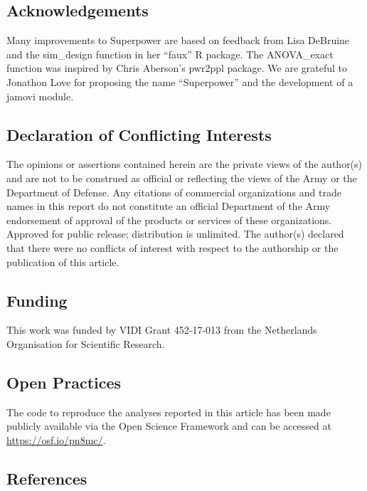 \documentclass[
  ,jou,floatsintext]{apa6}
\begin{document}
\hypertarget{acknowledgements}{%
\subsection{Acknowledgements}\label{acknowledgements}}

Many improvements to Superpower are based on feedback from Lisa DeBruine and the sim\_design function in her \enquote{faux} R package. The ANOVA\_exact function was inspired by Chris Aberson's pwr2ppl package. We are grateful to Jonathon Love for proposing the name \enquote{Superpower} and the development of a jamovi module.

\hypertarget{declaration-of-conflicting-interests}{%
\subsection{Declaration of Conflicting Interests}\label{declaration-of-conflicting-interests}}

The opinions or assertions contained herein are the private views of the author(s) and are not to be construed as official or reflecting the views of the Army or the Department of Defense. Any citations of commercial organizations and trade names in this report do not constitute an official Department of the Army endorsement of approval of the products or services of these organizations. Approved for public release; distribution is unlimited. The author(s) declared that there were no conflicts of interest with respect to the authorship or the publication of this article.

\hypertarget{funding}{%
\subsection{Funding}\label{funding}}

This work was funded by VIDI Grant 452-17-013 from the Netherlands Organisation for Scientific Research.

\hypertarget{open-practices}{%
\subsection{Open Practices}\label{open-practices}}

The code to reproduce the analyses reported in this article has been made publicly available via the Open Science Framework and can be accessed at \url{https://osf.io/pn8mc/}.

\hypertarget{references}{%
\subsection{References}\label{references}}
\end{document}
